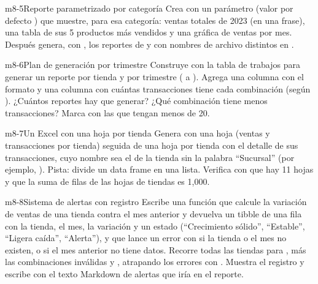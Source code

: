 \begin{ejercicio}{m8-5}{Reporte parametrizado por categoría}
Crea  con un parámetro
 (valor por defecto ) que muestre,
para esa categoría: ventas totales de 2023 (en una frase), una tabla de sus
5 productos más vendidos y una gráfica de ventas por mes. Después genera,
con , los reportes de  y 
con nombres de archivo distintos en .
\end{ejercicio}

\begin{ejercicio}{m8-6}{Plan de generación por trimestre}
Construye con  la tabla de trabajos para generar un
reporte por tienda y por trimestre ( a ). Agrega una
columna  con el formato
 y una columna
 con cuántas transacciones tiene cada combinación
(según ). ¿Cuántos reportes hay que generar?
¿Qué combinación tiene menos transacciones? Marca con
 las que tengan menos de 20.
\end{ejercicio}

\begin{ejercicio}{m8-7}{Un Excel con una hoja por tienda}
Genera  con una hoja
 (ventas y transacciones por tienda) seguida de una hoja
por tienda con el detalle de sus transacciones, cuyo nombre sea el de la
tienda sin la palabra ``Sucursal'' (por ejemplo, ). Pista:
 divide un data frame en una lista. Verifica con
 que hay 11 hojas y que la suma de filas de las
hojas de tiendas es 1,000.
\end{ejercicio}

\begin{ejercicio}{m8-8}{Sistema de alertas con registro}
Escribe una función  que calcule la
variación de ventas de una tienda contra el mes anterior y devuelva un
tibble de una fila con la tienda, el mes, la variación y un estado
(``Crecimiento sólido'', ``Estable'', ``Ligera caída'', ``Alerta''), y que
lance un error con  si la tienda o el mes no existen, o si el
mes anterior no tiene datos. Recorre todas las tiendas para
, más las combinaciones inválidas 
y , atrapando los errores con .
Muestra el registro y escribe con  el texto Markdown de
alertas que iría en el reporte.
\end{ejercicio}
